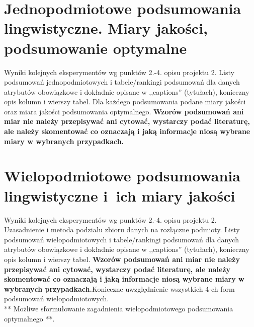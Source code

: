 \documentclass{classrep}
\begin{document}
\section{ Jednopodmiotowe podsumowania lingwistyczne. Miary jakości, podsumowanie optymalne}
Wyniki kolejnych eksperymentów wg punktów 2.-4. opisu projektu 2.  Listy podsumowań
jednopodmiotowych i tabele/rankingi podsumowań dla danych atrybutów obowiązkowe i dokładnie opisane w ,,captions'' (tytułach), konieczny opis kolumn i wierszy tabel. Dla każdego podsumowania podane miary jakości oraz miara jakości podsumowania
optymalnego. {\bf Wzorów podsumowań ani miar nie należy przepisywać ani cytować, wystarczy podać literaturę, ale
należy skomentować co oznaczają i jaką informacje niosą wybrane miary w wybranych
przypadkach.}\\

\section{Wielopodmiotowe podsumowania lingwistyczne i~ich miary jakości} 
Wyniki kolejnych eksperymentów wg punktów 2.-4. opisu projektu 2. Uzasadnienie i
metoda podziału zbioru danych na rozłączne podmioty. Listy podsumowań
wielopodmiotowych i tabele/rankingi podsumowań dla danych atrybutów obowiązkowe i
dokładnie opisane w ,,captions'' (tytułach), konieczny opis kolumn i wierszy tabel.
{\bf Wzorów podsumowań ani miar nie należy przepisywać ani cytować, wystarczy podać literaturę, ale
należy skomentować co oznaczają i jaką informacje niosą wybrane miary w wybranych
przypadkach.}Konieczne uwzględnienie wszystkich 4-ch form podsumowań wielopodmiotowych. 
\\ 

** Możliwe sformułowanie zagadnienia wielopodmiotowego podsumowania optymalnego **.\\
\\

\end{document}
